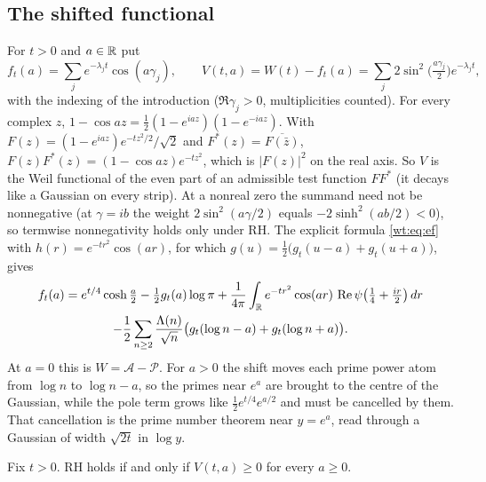 \subsection{The shifted functional}

For $t>0$ and $a\in\mathbb{R}$ put
\[
f_t(a)=\sum_je^{-\lambda_jt}\cos(a\gamma_j),\qquad V(t,a)=W(t)-f_t(a)=\sum_j2\sin^2\!\big(\tfrac{a\gamma_j}2\big)e^{-\lambda_jt},
\]
with the indexing of the introduction ($\Re\gamma_j>0$, multiplicities counted). For every complex $z$, $1-\cos az=\frac12(1-e^{iaz})(1-e^{-iaz})$. With $F(z)=(1-e^{iaz})e^{-tz^2/2}/\sqrt2$ and $F^*(z)=\overline{F(\bar z)}$, $F(z)F^*(z)=(1-\cos az)e^{-tz^2}$, which is $|F(z)|^2$ on the real axis. So $V$ is the Weil functional of the even part of an admissible test function $FF^*$ (it decays like a Gaussian on every strip). At a nonreal zero the summand need not be nonnegative (at $\gamma=ib$ the weight $2\sin^2(a\gamma/2)$ equals $-2\sinh^2(ab/2)<0$), so termwise nonnegativity holds only under RH. The explicit formula \eqref{wt:eq:ef} with $h(r)=e^{-tr^2}\cos(ar)$, for which $g(u)=\frac12\big(g_t(u-a)+g_t(u+a)\big)$, gives
\begin{multline}\label{wt:eq:fxa}
f_t(a)=e^{t/4}\cosh\tfrac a2-\tfrac12g_t(a)\log\pi+\frac1{4\pi}\int_{\mathbb{R}} e^{-tr^2}\cos(ar)\,\operatorname{Re}\psi\big(\tfrac14+\tfrac{ir}2\big)\,dr\\-\frac12\sum_{n\ge2}\frac{\Lambda(n)}{\sqrt n}\big(g_t(\log n-a)+g_t(\log n+a)\big).
\end{multline}
At $a=0$ this is $W=\mathcal A-\mathcal P$. For $a>0$ the shift moves each prime power atom from $\log n$ to $\log n-a$, so the primes near $e^a$ are brought to the centre of the Gaussian, while the pole term grows like $\frac12e^{t/4}e^{a/2}$ and must be cancelled by them. That cancellation is the prime number theorem near $y=e^a$, read through a Gaussian of width $\sqrt{2t}$ in $\log y$.

\begin{theorem}\label{wt:thm:sin2}
Fix $t>0$. RH holds if and only if $V(t,a)\ge0$ for every $a\ge0$.
\end{theorem}


